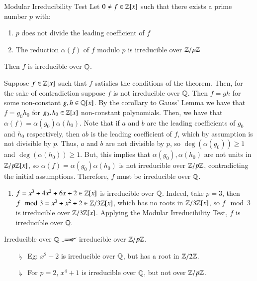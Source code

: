 \documentclass[12pt, a4paper, twoside, openright, titlepage]{book}
\begin{document}
\begin{namthm}{Modular Irreducibility Test}{}
    Let $0 \neq f \in \mathbb Z[x]$ such that there exists a prime number $p$ with: \begin{enumerate}
        \item $p$ does not divide the leading coefficient of $f$
        \item The reduction $\alpha(f)$ of $f$ modulo $p$ is irreducible over $\mathbb Z/p\mathbb Z$
    \end{enumerate}
    Then $f$ is irreducible over $\mathbb Q$.
\end{namthm}
\begin{proof*}{}{}
    Suppose $f \in \mathbb Z[x]$ such that $f$ satisfies the conditions of the theorem. Then, for the sake of contradiction suppose $f$ is not irreducible over $\mathbb Q$. Then $f = gh$ for some non-constant $g,h \in \mathbb Q[x]$. By the corollary to Gauss' Lemma we have that $f = g_0h_0$ for $g_0,h_0 \in \mathbb Z[x]$ non-constant polynomials. Then, we have that $\alpha(f) = \alpha(g_0)\alpha(h_0)$. Note that if $a$ and $b$ are the leading coefficients of $g_0$ and $h_0$ respectively, then $ab$ is the leading coefficient of $f$, which by assumption is not divisible by $p$. Thus, $a$ and $b$ are not divisible by $p$, so $\deg(\alpha(g_0)) \geq 1$ and $\deg(\alpha(h_0)) \geq 1$. But, this implies that $\alpha(g_0),\alpha(h_0)$ are not units in $\mathbb Z/p\mathbb Z[x]$, so $\alpha(f) = \alpha(g_0)\alpha(h_0)$ is not irreducible over $\mathbb Z/p\mathbb Z$, contradicting the initial assumptions. Therefore, $f$ must be irreducible over $\mathbb Q$.
\end{proof*}

\begin{eg}{}{}
    \leavevmode
    \begin{enumerate}
        \item $f = x^3+4x^2+6x+2 \in \mathbb Z[x]$ is irreducible over $\mathbb Q$. Indeed, take $p = 3$, then $f\mod 3 = x^3+x^2+2 \in \mathbb Z/3\mathbb Z[x]$, which has no roots in $\mathbb Z/3\mathbb Z[x]$, so $f\mod 3$ is irreducible over $\mathbb Z/3\mathbb Z[x]$. Applying the Modular Irreducibility Test, $f$ is irreducible over $\mathbb Q$.
    \end{enumerate}
\end{eg}

\begin{rmk}{}{}
    Irreducible over $\mathbb Q$ $\cancel{\implies}$ irreducible over $\mathbb Z/p\mathbb Z$.
    \begin{enumerate}
        \item[$\drsh$] Eg: $x^2 - 2$ is irreducible over $\mathbb Q$, but has a root in $\mathbb Z/2\mathbb Z$. 
        \item[$\drsh$] For $p=2$, $x^4 + 1$ is irreducible over $\mathbb Q$, but not over $\mathbb Z/p\mathbb Z$.
    \end{enumerate}
\end{rmk}
\end{document}
